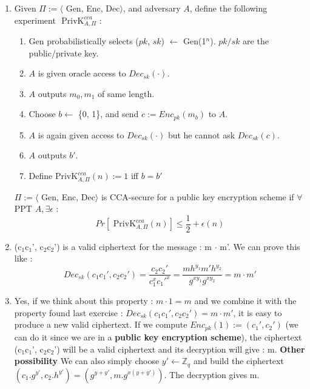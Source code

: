 \begin{solution}
\begin{enumerate}
    \item 
    Given  $\Pi := \langle$ Gen, Enc, Dec$\rangle$, and adversary $A$, define the following experiment $\text{ PrivK}^{cca}_{A, \Pi}$ : 
    \begin{enumerate}
        \item Gen probabilistically selects ($pk$, $sk$) $\leftarrow$ Gen(1$^n$). $pk / sk$ are the public/private key.
        \item $A$ is given oracle access to $Dec_{sk}(\cdot)$.
        \item $A$ outputs $m_0, m_1$ of same length.
        \item Choose $b \leftarrow$ \{0, 1\}, and send $c := Enc_{pk}(m_b)$ to $A$.
        \item $A$ is again given access to $Dec_{sk}(\cdot)$ but he cannot ask $Dec_{sk}(c)$.
        \item $A$ outputs $b'$.
        \item Define $\text{PrivK}^{cca}_{A, \Pi}(n) := 1$ iff $b=b'$
    \end{enumerate}
    $\Pi := \langle$ Gen, Enc, Dec$\rangle$ is CCA-secure for a public key encryption scheme if $\forall$ PPT $A, \exists \epsilon$ :
    $$ Pr[\text{ PrivK}^{cca}_{A, \Pi}(n)] \leq \frac{1}{2} + \epsilon(n) $$
    
    \item (c$_1$c$_1$', c$_2$c$_2$') is a valid ciphertext for the message : m $\cdot$ m'. \newline
    We can prove this like : 
    $$Dec_{sk}(c_1c_1',c_2c_2') = \frac{c_2c_2'}{c_1^xc_1'^x} = \frac{mh^{y_1}m'h^{y_2}}{g^{xy_1}g^{xy_2}} = m \cdot m'$$
    
    \item Yes, if we think about this property : $m \cdot 1 = m$ and we combine it with the property found last exercise : $Dec_{sk}(c_1c_1',c_2c_2') = m \cdot m'$, it is easy to produce a new valid ciphertext. \newline
    If we compute $Enc_{pk}(1) := (c_1', c_2')$ (we can do it since we are in a \textbf{public key encryption scheme}), the ciphertext (c$_1$c$_1$', c$_2$c$_2$') will be a valid ciphertext and its decryption will give : m.
    \newline
    \textbf{Other possibility} \newline
    We can also simply choose $y' \leftarrow \mathbb{Z}_q$ and build the ciphertext $(c_1.g^{y'},c_2.h^{y'})=(g^{y+y'},m.g^{x(y+y')})$. The decryption gives m.
    

\end{enumerate}
\end{solution}
